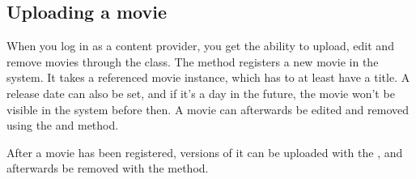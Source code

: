 \subsection{Uploading a movie}
\label{Manual_Service_Usage_Upload}
When you log in as a content provider, you get the ability to upload, edit and remove movies through the  class. The  method registers a new movie in the system. It takes a referenced movie instance, which has to at least have a title. A release date can also be set, and if it's a day in the future, the movie won't be visible in the system before then. A movie can afterwards be edited and removed using the  and  method.

After a movie has been registered, versions of it can be uploaded with the , and afterwards be removed with the  method.
